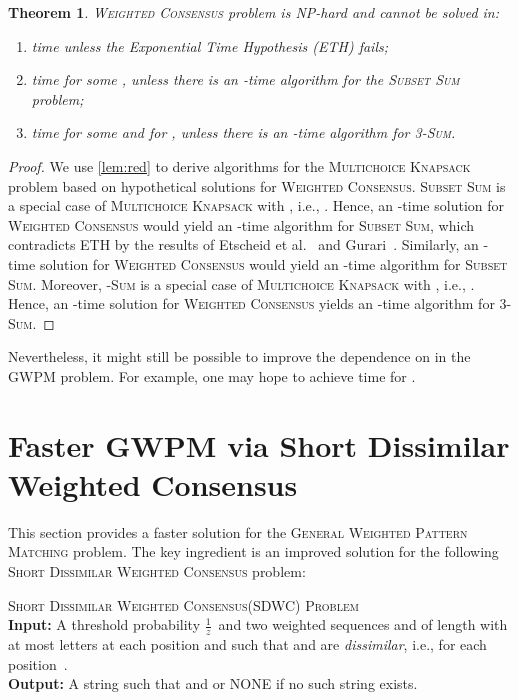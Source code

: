 \documentclass{article}
\theoremstyle{plain}
\newtheorem{theorem}{Theorem}[section]
\theoremstyle{definition}
\newenvironment{dsproblem}[1]
{\begin{center}\begin{lrbox}{\mybox}\begin{minipage}{0.96\columnwidth}#1 \textsc{Problem}\\}
{\end{minipage}\end{lrbox}\fbox{\usebox{\mybox}}\end{center}}
\newcommand{\defdsproblem}[3]{
  \begin{dsproblem}{#1}
\textbf{Input:} #2\\
\textbf{Output:} #3
  \end{dsproblem}
  }
\newcommand{\MK}{\textsc{Multichoice Knapsack}\xspace}
\newcommand{\GWPM}{\textsc{GWPM}\xspace}
\newcommand{\GWPMFull}{\textsc{General Weighted Pattern Matching}\xspace}
\newcommand{\WC}{\textsc{Weighted Consensus}\xspace}
\newcommand{\SDWCFull}{\textsc{Short Dissimilar Weighted Consensus}\xspace}
\newcommand{\SDWC}{\textsc{SDWC}\xspace}
\newcommand{\SubsetSum}{\textsc{Subset Sum}\xspace}
\newcommand{\Sum}{\textsc{Sum}\xspace}
\newcommand{\fr}{\ensuremath{\frac1z}}
\begin{document}
  \begin{theorem}\label{thm:lb}
  \WC problem is NP-hard and cannot be solved in:
  \begin{enumerate}
   \item  time unless the Exponential Time Hypothesis (ETH) fails;
   \item  time for some , unless there is an -time algorithm for the \SubsetSum problem;
    \item  time for some  and for , unless
    there is an -time algorithm for 3-\Sum.
    \end{enumerate}
  \end{theorem}
    \begin{proof}
    We use \cref{lem:red} to derive algorithms for the \MK problem based on hypothetical solutions for \WC.
    \SubsetSum is a special case of \MK with , i.e., . Hence,
    an -time solution for \WC would yield an -time algorithm for \SubsetSum,
    which contradicts ETH by the results of Etscheid et al.~\cite{DBLP:conf/mfcs/EtscheidKMR15} and Gurari~\cite{DBLP:books/daglib/0069796}.
    Similarly, an -time solution for \WC would yield an -time algorithm for \SubsetSum. 
    Moreover, -\Sum is a special case of \MK with , i.e., .
    Hence, an -time solution for \WC yields
    an -time algorithm for 3-\Sum.
    \end{proof}

    Nevertheless, it might still be possible to improve the dependence on  in the \GWPM problem.
    For example, one may hope to achieve  time for .






  
  







 
   
    
  
  \section{Faster \GWPM via Short Dissimilar Weighted Consensus}\label{app:SDWC}
  This section provides a faster solution for the \GWPMFull problem.
  The key ingredient is an improved solution for the following \SDWCFull problem:
     \defdsproblem{\SDWCFull (\SDWC)}{
      A  threshold probability \fr\ and two weighted sequences  and  of length  with at most  letters at each position
      and such that   and  are \emph{dissimilar}, i.e.,  for each position~.
    }{
      A string  such that  and  or NONE if no such string exists.
    }
    
\end{document}
